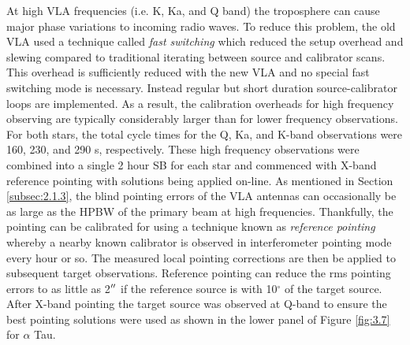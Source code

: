 At high VLA frequencies (i.e. K, Ka, and Q band) the troposphere can cause major phase variations to incoming radio waves. To reduce this problem, the old VLA used a technique called \textit{fast switching} which reduced the setup overhead and slewing compared to traditional iterating between source and calibrator scans. This overhead is sufficiently reduced with the new VLA and no special fast switching mode is necessary. Instead regular but short duration source-calibrator loops are implemented. As a result, the calibration overheads for high frequency observing are typically considerably larger than for lower frequency observations. For both stars, the total cycle times for the Q, Ka, and K-band observations were 160, 230, and 290 s, respectively. These high frequency observations were combined into a single 2 hour SB for each star and commenced with X-band reference pointing with solutions being applied on-line. As mentioned in Section \ref{subsec:2.1.3}, the blind pointing errors of the VLA antennas can occasionally be as large as the HPBW of the primary beam at high frequencies. Thankfully, the pointing can be calibrated for using a technique known as \textit{reference pointing} whereby a nearby known calibrator is observed in interferometer pointing mode every hour or so. The measured local pointing corrections are then be applied to subsequent target observations. Reference pointing can reduce the rms pointing errors to as little as 2$^{\prime\prime}$ if the reference source is with 10$^\circ$ of the target source. After X-band pointing the target source was observed at Q-band to ensure the best pointing solutions were used as shown in the lower panel of Figure \ref{fig:3.7} for $\alpha$ Tau.  